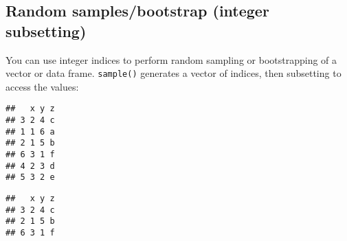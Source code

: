 \hypertarget{random-samplesbootstrap-integer-subsetting}{%
\subsection{Random samples/bootstrap (integer
subsetting)}\label{random-samplesbootstrap-integer-subsetting}}

You can use integer indices to perform random sampling or bootstrapping
of a vector or data frame. \texttt{sample()} generates a vector of
indices, then subsetting to access the values: 
  

\begin{Shaded}
\begin{Highlighting}[]
\StringTok{ }\NormalTok{(} \NormalTok{(}\OperatorTok{:}\NormalTok{, } \NormalTok{), } \OperatorTok{:}\NormalTok{, }\NormalTok{ letters[}\OperatorTok{:}\NormalTok{])}

\NormalTok{(}\NormalTok{)}

\NormalTok{df[}\NormalTok{(}\NormalTok{(df)), ]}
\end{Highlighting}
\end{Shaded}

\begin{verbatim}
##   x y z
## 3 2 4 c
## 1 1 6 a
## 2 1 5 b
## 6 3 1 f
## 4 2 3 d
## 5 3 2 e
\end{verbatim}

\begin{Shaded}
\begin{Highlighting}[]
\NormalTok{df[}\NormalTok{(}\NormalTok{), ]}
\end{Highlighting}
\end{Shaded}

\begin{verbatim}
##   x y z
## 3 2 4 c
## 2 1 5 b
## 6 3 1 f
\end{verbatim}

\begin{Shaded}
\begin{Highlighting}[]
\NormalTok{df[}\NormalTok{(}\NormalTok{, }\NormalTok{ T), ]}
\end{Highlighting}
\end{Shaded}

